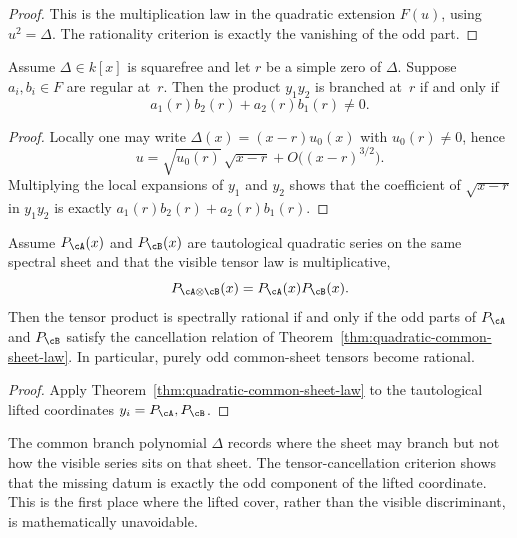 \begin{proof}
This is the multiplication law in the quadratic extension $F(u)$, using
$u^2=\Delta$.  The rationality criterion is exactly the vanishing of the odd
part.
\end{proof}

\begin{theorem}
\label{thm:local-branch-survival-criterion}
Assume $\Delta\in k[x]$ is squarefree and let $r$ be a simple zero of
$\Delta$.  Suppose $a_i,b_i\in F$ are regular at~$r$.  Then the product
$y_1y_2$ is branched at~$r$ if and only if
\[
a_1(r)b_2(r)+a_2(r)b_1(r)\neq 0.
\]
\end{theorem}

\begin{proof}
Locally one may write
$\Delta(x)=(x-r)u_0(x)$ with $u_0(r)\neq 0$, hence
\[
u=\sqrt{u_0(r)}\,\sqrt{x-r}+O\bigl((x-r)^{3/2}\bigr).
\]
Multiplying the local expansions of $y_1$ and $y_2$ shows that the coefficient
of $\sqrt{x-r}$ in $y_1y_2$ is exactly
$a_1(r)b_2(r)+a_2(r)b_1(r)$.
\end{proof}

\begin{corollary}
\label{cor:tautological-quadratic-tensor-cancellation}
Assume $P_{\cA}(x)$ and $P_{\cB}(x)$ are tautological quadratic series on the
same spectral sheet and that the visible tensor law is multiplicative,
\[
P_{\cA\otimes\cB}(x)=P_{\cA}(x)P_{\cB}(x).
\]
Then the tensor product is spectrally rational if and only if the odd parts of
$P_{\cA}$ and $P_{\cB}$ satisfy the cancellation relation of
Theorem~\ref{thm:quadratic-common-sheet-law}.  In particular, purely odd
common-sheet tensors become rational.
\end{corollary}

\begin{proof}
Apply Theorem~\ref{thm:quadratic-common-sheet-law} to the tautological lifted
coordinates $y_i=P_{\cA},P_{\cB}$.
\end{proof}

\begin{remark}
\label{rem:visible-discriminant-misses-odd-part}
The common branch polynomial $\Delta$ records where the sheet may branch but not
how the visible series sits on that sheet.  The tensor-cancellation criterion
shows that the missing datum is exactly the odd component of the lifted
coordinate.  This is the first place where the lifted cover, rather than the
visible discriminant, is mathematically unavoidable.
\end{remark}

